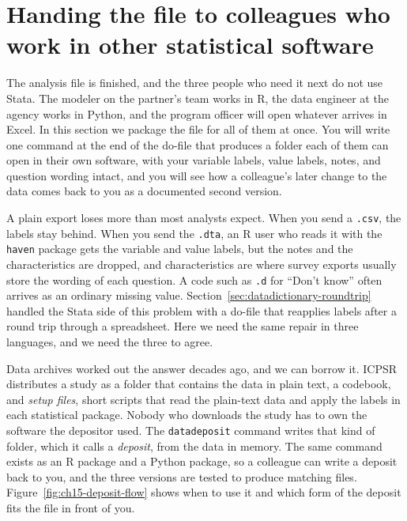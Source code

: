 \section{Handing the file to colleagues who work in other statistical software}\label{sec:deposit}
The analysis file is finished, and the three people who need it next do not use Stata. The modeler on the partner's team works in R, the data engineer at the agency works in Python, and the program officer will open whatever arrives in Excel. In this section we package the file for all of them at once. You will write one command at the end of the do-file that produces a folder each of them can open in their own software, with your variable labels, value labels, notes, and question wording intact, and you will see how a colleague's later change to the data comes back to you as a documented second version.

A plain export loses more than most analysts expect. When you send a \texttt{.csv}, the labels stay behind. When you send the \texttt{.dta}, an R user who reads it with the \texttt{haven} package gets the variable and value labels, but the notes and the characteristics are dropped, and characteristics are where survey exports usually store the wording of each question. A code such as \texttt{.d} for \enquote{Don't know} often arrives as an ordinary missing value. Section~\ref{sec:datadictionary-roundtrip} handled the Stata side of this problem with a do-file that reapplies labels after a round trip through a spreadsheet. Here we need the same repair in three languages, and we need the three to agree.

Data archives worked out the answer decades ago, and we can borrow it. ICPSR distributes a study as a folder that contains the data in plain text, a codebook, and \emph{setup files}, short scripts that read the plain-text data and apply the labels in each statistical package. Nobody who downloads the study has to own the software the depositor used. The \texttt{datadeposit} command writes that kind of folder, which it calls a \emph{deposit}, from the data in memory. The same command exists as an R package and a Python package, so a colleague can write a deposit back to you, and the three versions are tested to produce matching files. Figure~\ref{fig:ch15-deposit-flow} shows when to use it and which form of the deposit fits the file in front of you.

